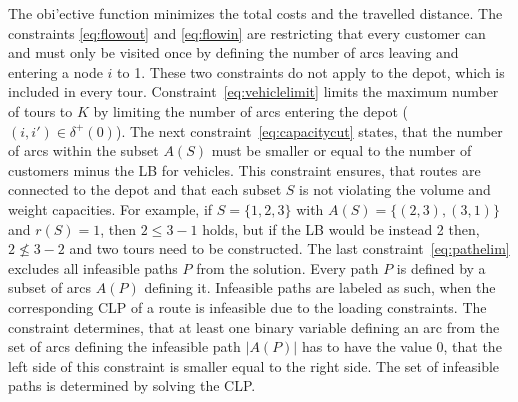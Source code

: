 The obi'ective function minimizes the total costs and the travelled distance. The constraints \ref{eq:flowout} and \ref{eq:flowin}
are restricting that every customer can and must only be visited once by defining the number
of arcs leaving and entering a node $i$ to 1. These two constraints do not apply to the depot,
which is included in every tour. Constraint~\ref{eq:vehiclelimit} limits the maximum number of
tours to $K$ by limiting the number of arcs entering the depot ($(i,i')\in \delta^+(0)$).
The next constraint~\ref{eq:capacitycut} states, that the number of arcs within the subset $A(S)$
must be smaller or equal to the number of customers minus the \gls{LB} for vehicles. This constraint
ensures, that routes are connected to the depot and that each subset $S$ is not violating
the volume and weight capacities. For example, if $S=\{1,2,3\}$ with $A(S)=\{(2,3),(3,1)\}$
and $r(S) = 1$, then $2 \leq 3 - 1$ holds, but if the \gls{LB} would be instead 2 then, $2 \not\leq 3 - 2$
and two tours need to be constructed. The last constraint~\ref{eq:pathelim} excludes all infeasible paths
$P$ from the solution. Every path $P$ is defined by a subset of arcs $A(P)$ defining it. Infeasible
paths are labeled as such, when the corresponding \gls{CLP} of a route is infeasible due to the loading
constraints. The constraint determines, that at least one binary variable defining an arc
from the set of arcs defining the infeasible path $|A(P)|$ has to have the value 0, that the left
side of this constraint is smaller equal to the right side. The set of infeasible paths is determined by
solving the \gls{CLP}.




